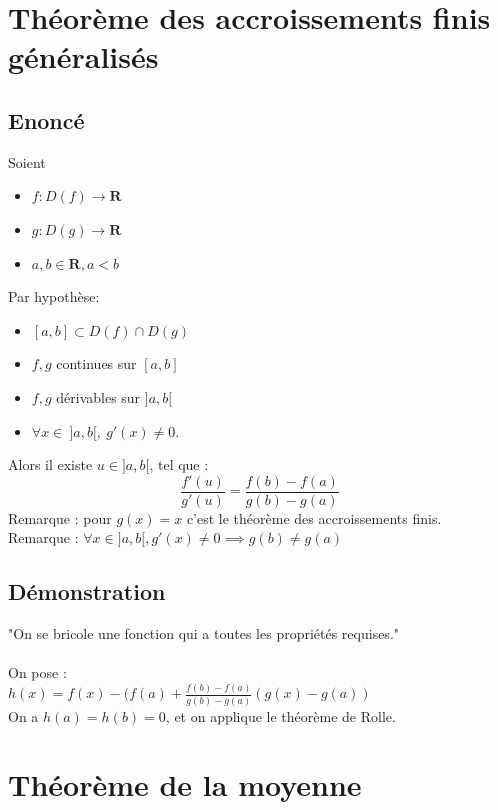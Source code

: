 \documentclass{article}
\begin{document}
\newpage

\section{Théorème des accroissements finis généralisés}

\subsection{Enoncé}

Soient 
\begin{itemize}
    \item $ f : D(f) \to \mathbf{R} $
    \item $ g : D(g) \to \mathbf{R} $
    \item $ a, b \in \mathbf{R}, a < b $
\end{itemize}
Par hypothèse:
\begin{itemize}
    \item $ [a,b] \subset D(f) \cap D(g) $
    \item $ f, g $ continues sur $ [a, b] $
    \item $ f, g $ dérivables sur $ ]a, b[ $
    \item $ \forall x \in\ ]a, b[,\ g'(x) \neq 0. $
\end{itemize}
Alors il existe $ u \in ]a, b[ $, tel que :
\[ \frac{f'(u)}{g'(u)} = \frac{f(b) - f(a)}{g(b) - g(a)}\]
Remarque : pour $ g(x) = x $ c'est le théorème des accroissements finis.\\
Remarque : $ \forall x \in ]a, b[, g'(x) \neq 0 \implies g(b) \neq g(a)$

\subsection{Démonstration}

"On se bricole une fonction qui a toutes les propriétés requises."\\\\
On pose :\\
$ h(x) = f(x) - (f(a) + \frac{f(b) - f(a)}{g(b) - g(a)}(g(x) - g(a)) $\\
On a $ h(a) = h(b) = 0 $, et on applique le théorème de Rolle.

\newpage

\section{Théorème de la moyenne}
\end{document}
